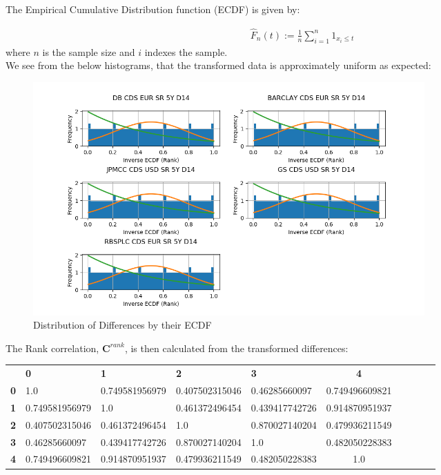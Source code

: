 \documentclass{report}
\theoremstyle{plain}
\theoremstyle{definition}
\begin{document}
The Empirical Cumulative Distribution function (ECDF) is given by:

\begin{align*}
\hat{F}_n(t) := \frac{1}{n}\sum_{i=1}^{n}1_{x_i \leq t}
\end{align*}
where $n$ is the sample size and $i$ indexes the sample.\\

We see from the below histograms, that the transformed data is approximately uniform as expected:

\begin{figure}[H]
	\begin{center}
		\includegraphics[width=15cm]{Inverse_ECDF_Rank.png}
		\caption{Distribution of Differences by their ECDF} 
		\label{Inverse_ECDF_Rank}
	\end{center}
\end{figure}

The Rank correlation, $\mathbf{C}^{rank}$, is then calculated from the transformed differences:

\begin{center}
	\begin{tabular}{|l|l|l|l|l|c|c|c|c|c|}
		\hline
		& \textbf{0} & \textbf{1} & \textbf{2} & \textbf{3} & \textbf{4}\\\hhline{|=|=|=|=|=|=|}
		\textbf{0} & 1.0 & 0.749581956979 & 0.407502315046 & 0.46285660097 & 0.749496609821\\
		\textbf{1} & 0.749581956979 & 1.0 & 0.461372496454 & 0.439417742726 & 0.914870951937\\
		\textbf{2} & 0.407502315046 & 0.461372496454 & 1.0 & 0.870027140204 & 0.479936211549\\
		\textbf{3} & 0.46285660097 & 0.439417742726 & 0.870027140204 & 1.0 & 0.482050228383\\
		\textbf{4} & 0.749496609821 & 0.914870951937 & 0.479936211549 & 0.482050228383 & 1.0\\
		\hline
	\end{tabular}
\end{center}
\end{document}
